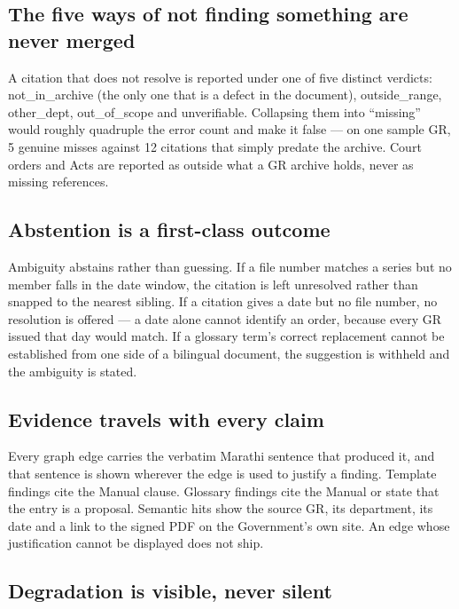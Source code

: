 \documentclass[11pt,a4paper]{article}
\newcommand{\code}[1]{{\mono\small #1}}
\begin{document}
\subsection*{The five ways of not finding something are never merged}

A citation that does not resolve is reported under one of five distinct verdicts:
\code{not\_in\_archive} (the only one that is a defect in the document), \code{outside\_range},
\code{other\_dept}, \code{out\_of\_scope} and \code{unverifiable}. Collapsing them into ``missing''
would roughly quadruple the error count and make it false --- on one sample GR, 5 genuine misses
against 12 citations that simply predate the archive. Court orders and Acts are reported as
outside what a GR archive holds, never as missing references.

\subsection*{Abstention is a first-class outcome}

Ambiguity abstains rather than guessing. If a file number matches a series but no member falls in
the date window, the citation is left unresolved rather than snapped to the nearest sibling. If a
citation gives a date but no file number, no resolution is offered --- a date alone cannot identify
an order, because every GR issued that day would match. If a glossary term's correct replacement
cannot be established from one side of a bilingual document, the suggestion is withheld and the
ambiguity is stated.

\subsection*{Evidence travels with every claim}

Every graph edge carries the verbatim Marathi sentence that produced it, and that sentence is
shown wherever the edge is used to justify a finding. Template findings cite the Manual clause.
Glossary findings cite the Manual or state that the entry is a proposal. Semantic hits show the
source GR, its department, its date and a link to the signed PDF on the Government's own site.
An edge whose justification cannot be displayed does not ship.

\subsection*{Degradation is visible, never silent}
\end{document}

